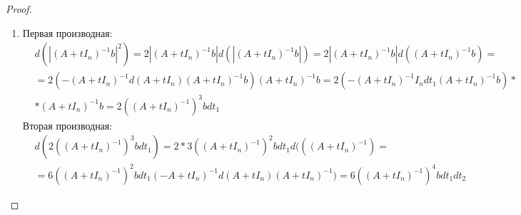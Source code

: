 \documentclass[a4paper]{article}
\begin{document}
\begin{proof}
\begin{enumerate}[label=(\alph*)]
        \item Первая производная:
        \begin{align*}
        &d(|(A+t I_n)^{-1}b|^2 ) = 2|(A+t I_n)^{-1}b|d(|(A+t I_n)^{-1}b| ) = 2|(A+t I_n)^{-1}b|d((A+t I_n)^{-1}b) = \\ & = 2(-(A+t I_n)^{-1} d(A+t I_n)(A+t I_n)^{-1} b)(A+t I_n)^{-1}b = 2(-(A+t I_n)^{-1} I_n d t_1 (A+t I_n)^{-1} b) * \\ & * (A+t I_n)^{-1}b = 2((A+t I_n)^{-1})^3b d t_1
        \end{align*}
        Вторая производная:
        \begin{align*}
        &d(2((A+t I_n)^{-1})^3b d t_1) = 2*3((A+t I_n)^{-1})^2b d t_1 d(((A+t I_n)^{-1}) = \\ & = 6((A+t I_n)^{-1})^2b d t_1(-A+t I_n)^{-1}d(A+t I_n)(A+t I_n)^{-1}) = 6((A+t I_n)^{-1})^4b d t_1 d t_2
        \end{align*}
    \end{enumerate}
\end{proof}
\end{document}
